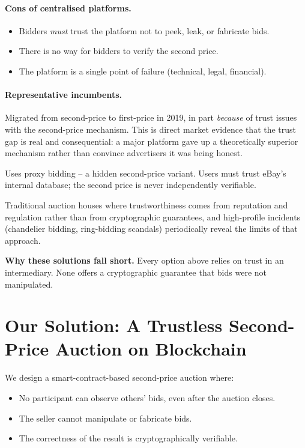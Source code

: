 \documentclass[11pt,a4paper]{article}
\begin{document}
\paragraph{Cons of centralised platforms.}
\begin{itemize}[leftmargin=*,nosep]
\item Bidders \emph{must} trust the platform not to peek, leak, or fabricate bids.
\item There is no way for bidders to verify the second price.
\item The platform is a single point of failure (technical, legal, financial).
\end{itemize}

\paragraph{Representative incumbents.}
\begin{description}[leftmargin=1em,style=nextline]
\item[Google Ads.] Migrated from second-price to first-price in 2019, in part
\emph{because} of trust issues with the second-price mechanism. This is direct
market evidence that the trust gap is real and consequential: a major platform
gave up a theoretically superior mechanism rather than convince advertisers it
was being honest.
\item[eBay.] Uses proxy bidding -- a hidden second-price variant. Users must
trust eBay's internal database; the second price is never independently
verifiable.
\item[Christie's / Sotheby's.] Traditional auction houses where
trustworthiness comes from reputation and regulation rather than from
cryptographic guarantees, and high-profile incidents (chandelier bidding,
ring-bidding scandals) periodically reveal the limits of that approach.
\end{description}
\noindent\textbf{Why these solutions fall short.} Every option above relies on
trust in an intermediary. None offers a cryptographic guarantee that bids were
not manipulated.

\section{Our Solution: A Trustless Second-Price Auction on Blockchain}

We design a smart-contract-based second-price auction where:
\begin{itemize}[leftmargin=*,nosep]
\item No participant can observe others' bids, even after the auction closes.
\item The seller cannot manipulate or fabricate bids.
\item The correctness of the result is cryptographically verifiable.
\end{itemize}
\end{document}
